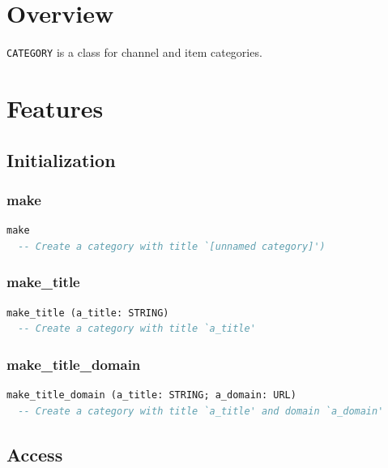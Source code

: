 \section{Overview}
\label{sec:feed-category-overview}

\texttt{CATEGORY} is a class for channel and item categories.


\section{Features}
\label{sec:feed-category-features}

\subsection{Initialization}
\label{sec:category-initialization}

\subsubsection{make}

\begin{lstlisting}[language=Eiffel]
make
  -- Create a category with title `[unnamed category]')
\end{lstlisting}

\subsubsection{make\_title}

\begin{lstlisting}[language=Eiffel]
make_title (a_title: STRING)
  -- Create a category with title `a_title'
\end{lstlisting}

\subsubsection{make\_title\_domain}

\begin{lstlisting}[language=Eiffel]
make_title_domain (a_title: STRING; a_domain: URL)
  -- Create a category with title `a_title' and domain `a_domain'
\end{lstlisting}


\subsection{Access}

\label{sec:category-access}

